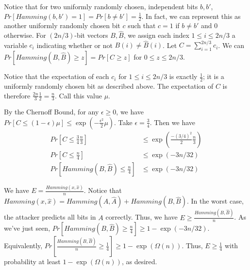 \begin{enumerate}[(a)]
\begin{enumerate}[(i)]
                Notice that for two uniformly randomly chosen, independent bits $b, b'$, $Pr[Hamming(b, b') = 1] = Pr[b
                \ne b'] = \frac12$.  In fact, we can represent this as another uniformly randomly chosen bit $c$ such
                that $c = 1$ if $b \ne b'$ and 0 otherwise.  For $(2n/3)$-bit vectors $B, \hat{B}$, we assign each
                index $1 \le i \le 2n/3$ a variable $c_i$ indicating whether or not $B(i) \ne \hat{B}(i)$. Let $C =
                \sum_{i=1}^{2n/3} c_i$.  We can
                $Pr[Hamming(B, \hat{B}) \ge z] = Pr[C \ge z]$ for $0 \le z \le 2n/3$.  

                Notice that the expectation of each $c_i$ for $1 \le i \le 2n/3$ is exactly $\frac12$; it is a
                uniformly randomly chosen bit as described above.  The expectation of $C$ is therefore $\frac{2n}{3}
                \frac{1}{2} = \frac{n}{3}$.  Call this value $\mu$.

                By the Chernoff Bound, for any $\epsilon \ge 0$, we have $Pr[C \le (1-\epsilon)\mu] \le \exp\left(
                -\frac{\epsilon^2}{2}\mu \right)$.  Take $\epsilon = \frac34$.  Then we have
                \begin{align*}
                    Pr[C \le \frac34 \frac{n}{3}] &\le \exp \left( \frac{-(3/4)^2}{2} \frac{n}{3} \right) \\
                    Pr[C \le \frac{n}{4} ] &\le \exp(-3n/32) \\
                    Pr[Hamming(B, \hat{B}) \le \frac{n}{4}]&\le \exp(-3n/32)
                \end{align*}

                We have $E = \frac{Hamming(x, \hat{x})}{n}$.  Notice that $Hamming(x, \hat{x}) = Hamming(A, \hat{A}) +
                Hamming(B, \hat{B})$.
                In the worst case, the attacker predicts all bits in $A$ correctly.  Thus, we have $E \ge
                \frac{Hamming(B, \hat{B})}{n}$.
                As we've just seen, $Pr[Hamming(B, \hat{B}) \ge \frac{n}{4}] \ge 1 - \exp(-3n/32)$.  Equivalently,
                $Pr[\frac{Hamming(B, \hat{B})}{n} \ge \frac14] \ge 1 - \exp(\Omega(n))$.
                Thus, $E \ge \frac14$ with probability at least $1 - \exp(\Omega(n))$, as desired.
        \end{enumerate}
\end{enumerate}

%
